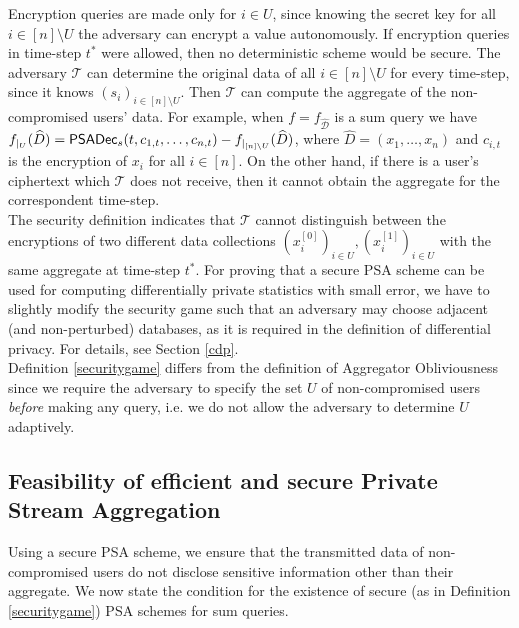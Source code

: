 \documentclass[10pt]{extarticle}
\begin{document}
Encryption queries are made only for $i\in U$, since knowing the secret key for all $i\in[n]\setminus U$ the adversary can encrypt a value autonomously. If encryption queries in time-step $t^*$ were allowed, then no deterministic scheme would be secure. The adversary $\mathcal{T}$ can determine the original data of all $i\in[n]\setminus U$ for every time-step, since it knows $(s_i)_{i\in[n]\setminus U}$. Then $\mathcal{T}$ can compute the aggregate of the non-compromised users' data. For example, when $f=f_{\widehat{\mathcal{D}}}$ is a sum query we have 
$f_{|_U}(\widehat{D})=\mbox{\upshape\sffamily PSADec}_s(t,c_{1,t},\ldots,c_{n,t})-f_{|_{[n]\setminus U}}(\widehat{D})$,
where $\widehat{D}=(x_1,\ldots,x_n)$ and $c_{i,t}$ is the encryption of $x_i$ for all $i\in[n]$. On the other hand, if there is a user's ciphertext which $\mathcal{T}$ does not receive, then it cannot obtain the aggregate for the correspondent time-step.\\ 
The security definition indicates that $\mathcal{T}$ cannot distinguish between the encryptions of two different data collections $(x_i^{[0]})_{i\in U},(x_i^{[1]})_{i\in U}$ with the same aggregate at time-step $t^*$. For proving that a secure PSA scheme can be used for computing differentially private statistics with small error, we have to slightly modify the security game such that an adversary may choose adjacent (and non-perturbed) databases, as it is required in the definition of differential privacy. For details, see Section \ref{cdp}.\\
Definition \ref{securitygame} differs from the definition of Aggregator Obliviousness \cite{2} since we require the adversary to specify the set $U$ of non-compromised users \textit{before} making any query, i.e. we do not allow the adversary to determine $U$ adaptively.


\subsection{Feasibility of efficient and secure Private Stream Aggregation}

Using a secure PSA scheme, we ensure that the transmitted data of non-compromised users do not disclose sensitive information other than their aggregate. 
We now state the condition for the existence of secure (as in Definition \ref{securitygame}) PSA schemes for sum queries.
\end{document}
